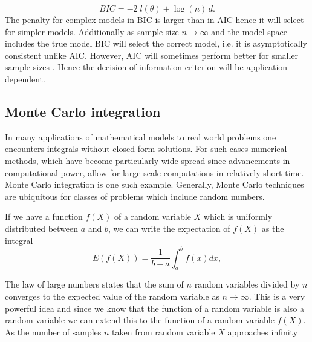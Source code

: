 \begin{equation}
  \label{eq:bic-def}
  BIC = -2 \; l(\theta) + \log(n) \,d.
\end{equation}
The penalty for complex models in BIC is larger than in AIC hence it will select for simpler models. Additionally as sample size $n\rightarrow \infty$ and the model space includes the true model BIC will select the correct model, i.e. it is asymptotically consistent unlike AIC. However, AIC will sometimes perform better for smaller sample sizes \citep{hastie2001elements}. Hence the decision of information criterion will be application dependent.

\subsection{Monte Carlo integration}
\label{sec:monte-carlo-integr}

In many applications of mathematical models to real world problems one encounters integrals without closed form solutions. For such cases numerical methods, which have become particularly wide spread since advancements in computational power, allow for large-scale computations in relatively short time. Monte Carlo integration is one such example. Generally, Monte Carlo techniques are ubiquitous for classes of problems which include random numbers.

If we have a function $f(X)$ of a random variable $X$  which is uniformly distributed between $a$ and $b$, we can write the expectation of $f(X)$ as the integral
\begin{equation}
  \label{eq:mc-integ-def}
  E(f(X)) = \frac{1}{b-a} \int_a^b f(x) dx,
\end{equation}

The law of large numbers states that the sum of $n$ random variables divided by $n$ converges to the expected value of the random variable as $n \rightarrow \infty$. This is a very powerful idea and since we know that the function of a random variable is also a random variable we can extend this to the function of a random variable $f(X)$.  As the number of samples $n$ taken from random variable $X$ approaches infinity


